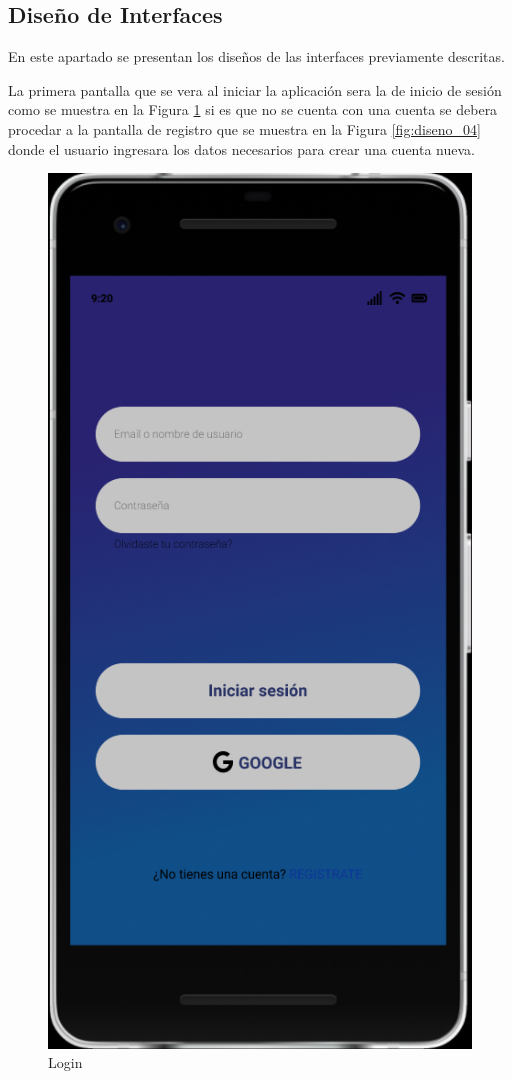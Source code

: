\documentclass{article}
\begin{document}
\subsection{Diseño de Interfaces}%
En este apartado se presentan los diseños de las interfaces previamente descritas.
\pagebreak

La primera pantalla que se vera al iniciar la aplicación sera la de inicio de sesión
como se muestra en la Figura \ref{fig:diseno_03} si es que no se cuenta con una cuenta
se debera procedar a la pantalla de registro que se muestra en la Figura 
\ref{fig:diseno_04} donde el usuario ingresara los datos necesarios para crear una 
cuenta nueva.


\begin{figure}[H]
    \centering
    \includegraphics[scale=0.8]{imgs/Figma/Login}
    \caption{Login}
    \label{fig:diseno_03}
\end{figure}
\end{document}
